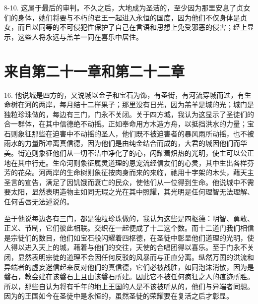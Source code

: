 8-10.  这属于最后的审判。不久之后，大地成为圣洁的，至少因为那里安息了贞女们的身体，她们将要与不朽的君王一起进入永恒的国度，因为他们不仅身体是贞女，而且以同等的不可侵犯性保护了自己在言语和思想上免受邪恶的侵害；经上显示，这些人将永远与羔羊一同在喜乐中居住。\par


\section{来自第二十一章和第二十二章}

16. 他说城是四方的，又说城以金子和宝石为饰，有圣街，有河流穿城而过，有生命树在河的两岸，每月结十二样果子；那里没有日光，因为羔羊是城的光；城门是独粒珍珠做的，每边有三门，门永不关闭。关于四方城，我认为这显示了圣徒们的合一群体，在其中信德绝不动摇。正如奉命用方木造方舟，以抵挡洪水的力量；宝石则象征那些在迫害中不动摇的圣人，他们既不被迫害者的暴风雨所动摇，也不被雨水的力量所冲离真信德，因为他们是由纯金结合而成的，大君的城因他们而华美。街道则象征他们从一切不洁中净化了的心，闪耀着炽热的光明，使主可以公正地在其中行走。生命河则象征属灵道理的恩宠流经信友们的心灵，其中生出各样芬芳的花朵。河两岸的生命树则象征按肉身而来的来临，祂用十字架的木头，藉天主圣言的宣告，满足了因饥饿而衰亡的民众，使他们从一位得到生命。他说城中不需要太阳，显然表明造物主如同无瑕之光在其中照耀，其光明是任何理智无法理解、任何舌唇无法述说的。\par

至于他说每边各有三门，都是独粒珍珠做的，我认为这些是四枢德：明智、勇敢、正义、节制，它们彼此相联。交织在一起便成了十二这个数。而十二道门我们相信是宗徒们的数目，他们如宝石般闪耀着四枢德，在圣徒中彰显他们道理的光明，使人得以进入天上的城，藉着与他们的交往，天使的合唱团得以喜乐。至于门永不关闭，显然表明宗徒的道理不会因任何反驳的风暴而与正直分离。纵然万国的洪流和异端者的虚妄迷信起来反对他们的真信德，它们必被战胜，如同泡沫消散，因为是磐石，教会建在该磐石上且由该磐石所建。因此它不被任何疯狂之人的痕迹所胜。所以，那些自认为将有千年的地上王国的人是不该被听从的，他们与异端者同想。因为的王国如今在圣徒中是永恒的，虽然圣徒的荣耀要在复活之后才彰显。\par

